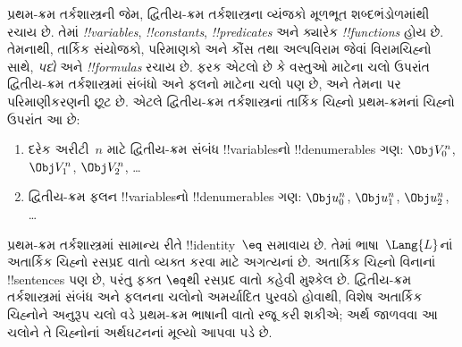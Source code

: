\documentclass[../../../include/open-logic-section]{subfiles}
\begin{document}


પ્રથમ-ક્રમ તર્કશાસ્ત્રની જેમ, દ્વિતીય-ક્રમ તર્કશાસ્ત્રના
વ્યંજકો મૂળભૂત શબ્દભંડોળમાંથી રચાય છે. તેમાં
\emph{!!{variable}s}, \emph{!!{constant}s},
\emph{!!{predicate}s} અને ક્યારેક \emph{!!{function}s}
હોય છે. તેમનાથી, તાર્કિક સંયોજકો, પરિમાણકો અને કૌંસ તથા
અલ્પવિરામ જેવાં વિરામચિહ્નો સાથે, \emph{પદો} અને
\emph{!!{formula}s} રચાય છે.
ફરક એટલો છે કે વસ્તુઓ માટેના ચલો ઉપરાંત દ્વિતીય-ક્રમ
તર્કશાસ્ત્રમાં સંબંધો અને ફલનો માટેના ચલો પણ છે,
અને તેમના પર પરિમાણીકરણની છૂટ છે.
એટલે દ્વિતીય-ક્રમ તર્કશાસ્ત્રનાં તાર્કિક ચિહ્નો
પ્રથમ-ક્રમનાં ચિહ્નો ઉપરાંત આ છે:

\begin{enumerate}
\item દરેક અરીટી~$n$ માટે દ્વિતીય-ક્રમ સંબંધ
!!{variable}sનો !!{denumerable}s ગણ:
$\Obj V_0^n$, $\Obj V_1^n$, $\Obj V_2^n$, \dots
\item દ્વિતીય-ક્રમ ફલન !!{variable}sનો !!{denumerable}s ગણ:
$\Obj u_0^n$, $\Obj u_1^n$, $\Obj u_2^n$, \dots
\end{enumerate}

પ્રથમ-ક્રમ તર્કશાસ્ત્રમાં સામાન્ય રીતે !!{identity}~$\eq$
સમાવાય છે. તેમાં ભાષા~$\Lang{L}$નાં અતાર્કિક ચિહ્નો
રસપ્રદ વાતો વ્યક્ત કરવા માટે અગત્યનાં છે.
અતાર્કિક ચિહ્નો વિનાનાં !!{sentence}s પણ છે,
પરંતુ ફક્ત $\eq$થી રસપ્રદ વાતો કહેવી મુશ્કેલ છે.
દ્વિતીય-ક્રમ તર્કશાસ્ત્રમાં સંબંધ અને ફલનના ચલોનો અમર્યાદિત
પુરવઠો હોવાથી, વિશેષ અતાર્કિક ચિહ્નોને અનુરૂપ ચલો વડે
પ્રથમ-ક્રમ ભાષાની વાતો રજૂ કરી શકીએ;
અર્થ જાળવવા આ ચલોને તે ચિહ્નોનાં અર્થઘટનનાં મૂલ્યો આપવા પડે છે.
\end{document}
